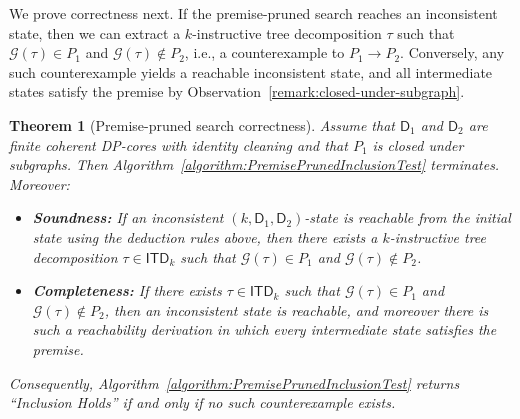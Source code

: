 \documentclass[11pt,a4paper]{article}
\newtheorem{theorem}{Theorem}
\newcommand{\treewidthvalue}{k}
\newcommand{\decompositiongraph}[1]{\mathcal{G}(#1)}
\newcommand{\allabstractdecompositionstreewidth}[1]{\mathsf{ITD}_{#1}}
\newcommand{\abstractdecomposition}{\tau}
\newcommand{\dpcore}{\mathsf{D}}
\begin{document}
We prove correctness next. If the premise-pruned search reaches an inconsistent state, then we can extract a $\treewidthvalue$-instructive tree decomposition $\abstractdecomposition$ such that $\decompositiongraph{\abstractdecomposition}\in P_1$ and $\decompositiongraph{\abstractdecomposition}\notin P_2$, i.e., a counterexample to $P_1\rightarrow P_2$. Conversely, any such counterexample yields a reachable inconsistent state, and all intermediate states satisfy the premise by Observation~\ref{remark:closed-under-subgraph}.

\begin{theorem}[Premise-pruned search correctness]
\label{theorem:premise-pruned-correctness}
Assume that $\dpcore_1$ and $\dpcore_2$ are finite coherent DP-cores with identity cleaning and that $P_1$ is closed under subgraphs. Then Algorithm~\ref{algorithm:PremisePrunedInclusionTest} terminates. Moreover:
\begin{itemize}
\setlength\itemsep{0em}
\item \textnormal{\textbf{Soundness:}} If an inconsistent $(\treewidthvalue,\dpcore_1,\dpcore_2)$-state is reachable from the initial state using the deduction rules above, then there exists a $\treewidthvalue$-instructive tree decomposition $\abstractdecomposition\in \allabstractdecompositionstreewidth{\treewidthvalue}$ such that $\decompositiongraph{\abstractdecomposition}\in P_1$ and $\decompositiongraph{\abstractdecomposition}\notin P_2$.
\item \textnormal{\textbf{Completeness:}} If there exists $\abstractdecomposition\in \allabstractdecompositionstreewidth{\treewidthvalue}$ such that $\decompositiongraph{\abstractdecomposition}\in P_1$ and $\decompositiongraph{\abstractdecomposition}\notin P_2$, then an inconsistent state is reachable, and moreover there is such a reachability derivation in which every intermediate state satisfies the premise.
\end{itemize}
Consequently, Algorithm~\ref{algorithm:PremisePrunedInclusionTest} returns ``Inclusion Holds'' if and only if no such counterexample exists.
\end{theorem}
\end{document}
